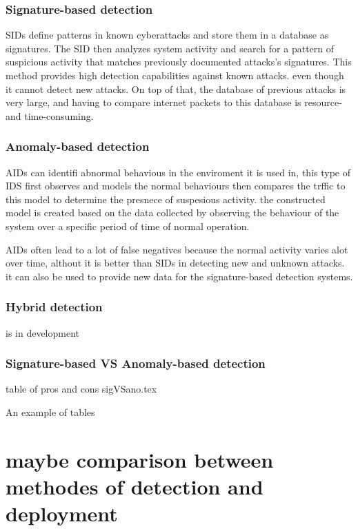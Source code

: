 \subsubsection{Signature-based detection}
SIDs define patterns in known cyberattacks and store them in a database as signatures. The SID then analyzes system activity and search for a pattern of suspicious activity that matches previously documented attacks's signatures. This method provides high detection capabilities against known attacks. even though it cannot detect new attacks. On top of that, the database of previous attacks is very large, and having to compare internet packets to this database is resource- and time-consuming. \cite{NIST-IDS}



\subsubsection{Anomaly-based detection}
AIDs can identifi abnormal behavious in the enviroment it is used in, this type of IDS first observes and models the normal behaviours then compares the trffic to this model to determine the presnece of suspesious activity. the constructed model is created based on the data collected by observing the behaviour of the system over a specific period of time of normal operation. \cite{NIST-IDS}

AIDs often lead to a lot of false negatives because the normal activity varies alot over time, althout it is better than SIDs in detecting new and unknown attacks. it can also be used to provide new data for the signature-based detection systems. \cite{NIST-IDS}




\subsubsection{Hybrid detection}
is in development

\subsubsection{Signature-based VS Anomaly-based detection}
table of pros and cons
sigVSano.tex
\begin{table}[h]
	\centering
	\caption{An example of tables}
	
	\label{tab:example}
\end{table}


\section{maybe comparison between methodes of detection and deployment}


